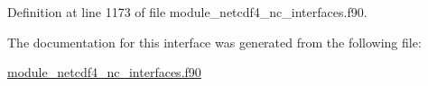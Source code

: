 Definition at line 1173 of file module\+\_\+netcdf4\+\_\+nc\+\_\+interfaces.\+f90.



The documentation for this interface was generated from the following file\+:\begin{DoxyCompactItemize}
\item 
\hyperlink{module__netcdf4__nc__interfaces_8f90}{module\+\_\+netcdf4\+\_\+nc\+\_\+interfaces.\+f90}\end{DoxyCompactItemize}
